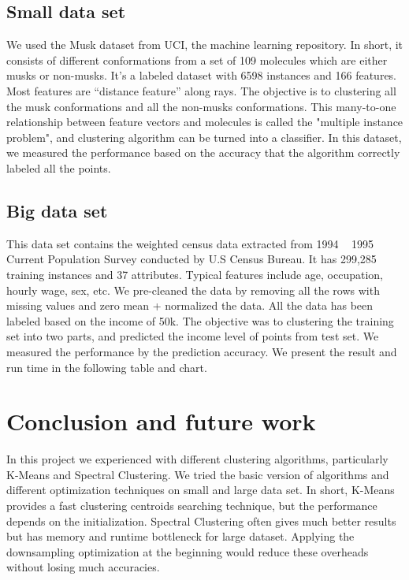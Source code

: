 \documentclass{acm_proc_article-sp}
\begin{document}
\subsection{Small data set}
We used the Musk dataset from UCI, the machine learning repository. In short, it consists of different conformations from a set of 109 molecules which are either musks or non-musks. It’s a labeled dataset with 6598 instances and 166 features. Most features are “distance feature” along rays.
The objective is to clustering all the musk conformations and all the non-musks conformations. This many-to-one relationship between feature vectors and molecules is called the "multiple instance problem", and clustering algorithm can be turned into a classifier. In this dataset, we measured the performance based on the accuracy that the algorithm correctly labeled all the points.
\\

\subsection{Big data set}
This data set contains the weighted census data extracted from 1994 ~ 1995 Current Population Survey conducted by U.S Census Bureau. It has 299,285 training instances and 37 attributes. Typical features include age, occupation, hourly wage, sex, etc. We pre-cleaned the data by removing all the rows with missing values and zero mean + normalized the data. All the data has been labeled based on the income of 50k. The objective was to clustering the training set into two parts, and predicted the income level of points from test set. We measured the performance by the prediction accuracy.
We present the result and run time in the following table and chart.


\section{Conclusion and future work}

In this project we experienced with different clustering algorithms, particularly K-Means and Spectral Clustering. We tried the basic version of algorithms and different optimization techniques on small and large data set. In short, K-Means provides a fast clustering centroids searching technique, but the performance depends on the initialization. Spectral Clustering often gives much better results but has memory and runtime bottleneck for large dataset. Applying the downsampling optimization at the beginning would reduce these overheads without losing much accuracies.  
\end{document}
